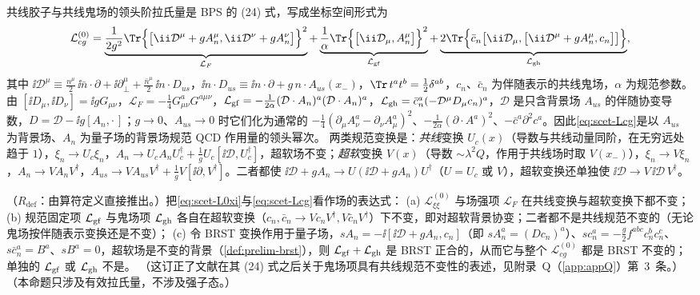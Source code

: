 共线胶子与共线鬼场的领头阶拉氏量是 BPS 的 (24) 式\cite{BauerPirjolStewart2002}，写成坐标空间形式为
\begin{equation}\label{eq:scet-Lcg}
\mathcal L^{(0)}_{cg}=\underbrace{\frac{1}{2g^2}\Tr\Big\{\big[\ii\mathcal D^\mu+gA_n^\mu,\ii\mathcal D^\nu+gA_n^\nu\big]\Big\}^2}_{\mathcal L_F}
+\underbrace{\frac1\alpha\Tr\Big\{\big[\ii\mathcal D_\mu,A_n^\mu\big]\Big\}^2}_{\mathcal L_{\rm gf}}
+\underbrace{2\Tr\Big\{\bar c_n\big[\ii\mathcal D_\mu,\big[\ii\mathcal D^\mu+gA_n^\mu,c_n\big]\big]\Big\}}_{\mathcal L_{\rm gh}},
\end{equation}
其中 $\ii\mathcal D^\mu\equiv\frac{n^\mu}{2}\,\ii\bar n\cdot\partial+\ii\partial_\perp^\mu+\frac{\bar n^\mu}{2}\,\ii n\cdot D_{us}$，$\ii n\cdot D_{us}\equiv\ii n\cdot\partial+g\,n\cdot A_{us}(x_-)$，$\Tr\,t^at^b=\frac12\delta^{ab}$，$c_n$、$\bar c_n$ 为伴随表示的共线鬼场，$\alpha$ 为规范参数。由 $[\ii D_\mu,\ii D_\nu]=\ii gG_{\mu\nu}$，$\mathcal L_F=-\frac14G^a_{\mu\nu}G^{a\mu\nu}$，$\mathcal L_{\rm gf}=-\frac{1}{2\alpha}(\mathcal D\cdot A_n)^a(\mathcal D\cdot A_n)^a$，$\mathcal L_{\rm gh}=\bar c_n^a(-\mathcal D^\mu D_{\mu}c_n)^a$，$\mathcal D$ 是只含背景场 $A_{us}$ 的伴随协变导数，$D=\mathcal D-\ii g[A_n,\cdot\,]$；$g\to0$、$A_{us}\to0$ 时它们化为通常的 $-\frac14(\partial_\mu A^a_\nu-\partial_\nu A^a_\mu)^2$、$-\frac1{2\alpha}(\partial\cdot A^a)^2$、$-\bar c^a\partial^2c^a$。因此\cref{eq:scet-Lcg}是以 $A_{us}$ 为背景场、$A_n$ 为量子场的背景场规范 QCD 作用量的领头幂次\cite{BauerPirjolStewart2002}。%
两类规范变换是：\emph{共线}变换 $U_c(x)$（导数与共线动量同阶，在无穷远处趋于 $1$），$\xi_n\to U_c\xi_n$，$A_n\to U_cA_nU_c^\dagger+\frac1gU_c[\ii\mathcal D,U_c^\dagger]$，超软场不变；\emph{超软}变换 $V(x)$（导数 $\sim\lambda^2Q$，作用于共线场时取 $V(x_-)$），$\xi_n\to V\xi_n$，$A_n\to VA_nV^\dagger$，$A_{us}\to VA_{us}V^\dagger+\frac1gV[\ii\partial,V^\dagger]$。二者都使 $\ii\mathcal D+gA_n\to U(\ii\mathcal D+gA_n)U^\dagger$（$U=U_c$ 或 $V$），超软变换还单独使 $\ii\mathcal D\to V\,\ii\mathcal D\,V^\dagger$。

\begin{proposition}\label{prop:scet-gauge}
（$R_{\mathrm{def}}$：由算符定义直接推出。）把\cref{eq:scet-L0xi}与\cref{eq:scet-Lcg}看作场的表达式：
(a) $\mathcal L^{(0)}_{\xi\xi}$ 与场强项 $\mathcal L_F$ 在共线变换与超软变换下都不变；
(b) 规范固定项 $\mathcal L_{\rm gf}$ 与鬼场项 $\mathcal L_{\rm gh}$ 各自在超软变换（$c_n,\bar c_n\to Vc_nV^\dagger,V\bar c_nV^\dagger$）下不变，即对超软背景协变；二者都不是共线规范不变的（无论鬼场按伴随表示变换还是不变）；
(c) 令 BRST 变换作用于量子场，$sA_n=-\ii[\ii\mathcal D+gA_n,c_n]$（即 $sA^a_n=(Dc_n)^a$）、$sc_n^a=-\frac g2f^{abc}c_n^bc_n^c$、$s\bar c_n^a=B^a$、$sB^a=0$，超软场是不变的背景（\cref{def:prelim-brst}），则 $\mathcal L_{\rm gf}+\mathcal L_{\rm gh}$ 是 BRST 正合的，从而它与整个 $\mathcal L^{(0)}_{cg}$ 都是 BRST 不变的；单独的 $\mathcal L_{\rm gf}$ 或 $\mathcal L_{\rm gh}$ 不是。
（这订正了文献\cite{BauerPirjolStewart2002}在其 (24) 式之后关于鬼场项具有共线规范不变性的表述，见附录~Q（\cref{app:appQ}）第~3~条。）（本命题只涉及有效拉氏量，不涉及强子态。）
\end{proposition}

